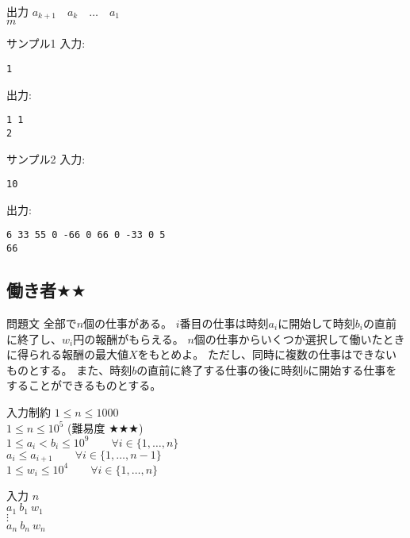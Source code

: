 \documentclass[a4paper,twoside,onecolumn,openany,article,10pt]{memoir}
\theoremstyle{remark}
\begin{document}
\begin{itembox}[l]{出力}
$a_{k+1}\quad  a_k\quad  \dotsc\quad  a_1$\\
$m$
\end{itembox}

\begin{itembox}[l]{サンプル1}
入力:
\begin{verbatim}
1
\end{verbatim}
出力:
\begin{verbatim}
1 1
2
\end{verbatim}
\end{itembox}

\begin{itembox}[l]{サンプル2}
入力:
\begin{verbatim}
10
\end{verbatim}
出力:
\begin{verbatim}
6 33 55 0 -66 0 66 0 -33 0 5
66
\end{verbatim}
\end{itembox}
\fi

\subsection{働き者$\bigstar\bigstar$}
\begin{itembox}[l]{問題文}
全部で$n$個の仕事がある。
$i$番目の仕事は時刻$a_i$に開始して時刻$b_i$の直前に終了し、$w_i$円の報酬がもらえる。
$n$個の仕事からいくつか選択して働いたときに得られる報酬の最大値$X$をもとめよ。
ただし、同時に複数の仕事はできないものとする。
また、時刻$b$の直前に終了する仕事の後に時刻$b$に開始する仕事をすることができるものとする。
\end{itembox}

\begin{itembox}[l]{入力制約}
$1\le n\le 1000$\\
$1\le n\le 10^5$ (難易度 $\bigstar\bigstar\bigstar$)\\
$1\le a_i < b_i\le 10^9\qquad \forall i\in\{1,\dotsc,n\}$\\
$a_i \le a_{i+1}\qquad \forall i\in\{1,\dotsc,n-1\}$\\
$1\le w_i \le 10^4\qquad \forall i\in\{1,\dotsc,n\}$
\end{itembox}

\begin{itembox}[l]{入力}
$n$\\
$a_1\ b_1\ w_1$\\
$\vdots$\\
$a_n\ b_n\ w_n$
\end{itembox}
\end{document}

